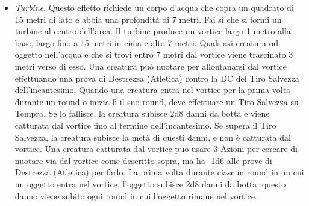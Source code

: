 \begin{multicols}{2}
\begin{itemize}
\item 
\textit{Turbine}. Questo effetto richiede un corpo d'acqua che copra un quadrato di 15 metri di lato e abbia una profondità di 7 metri. Fai sì che si formi un turbine al centro dell'area. Il turbine produce un vortice largo 1 metro alla base, largo fino a 15 metri in cima e alto 7
metri. Qualsiasi creatura od oggetto nell'acqua e che si trovi entro 7 metri dal vortice viene trascinato 3 metri verso di esso. Una creatura può nuotare per allontanarsi dal vortice effettuando una prova di Destrezza (Atletica) contro la DC del Tiro Salvezza dell'incantesimo.
Quando una creatura entra nel vortice per la prima volta durante un round o inizia lì il suo round, deve effettuare un Tiro Salvezza su Tempra. Se lo fallisce, la creatura subisce 2d8 danni da botta e viene catturata dal vortice fino al termine dell'incantesimo. Se supera il Tiro Salvezza, la creatura subisce la metà di questi danni, e non è catturata dal vortice. Una creatura catturata dal vortice può usare 3 Azioni per cercare di nuotare via dal vortice come descritto sopra, ma ha -1d6 alle prove di Destrezza (Atletica) per farlo. La prima volta durante ciascun round in un cui un oggetto entra nel vortice, l'oggetto subisce 2d8 danni da botta; questo danno viene subito ogni round in cui l'oggetto rimane nel vortice.
\end{itemize}



\end{multicols}
